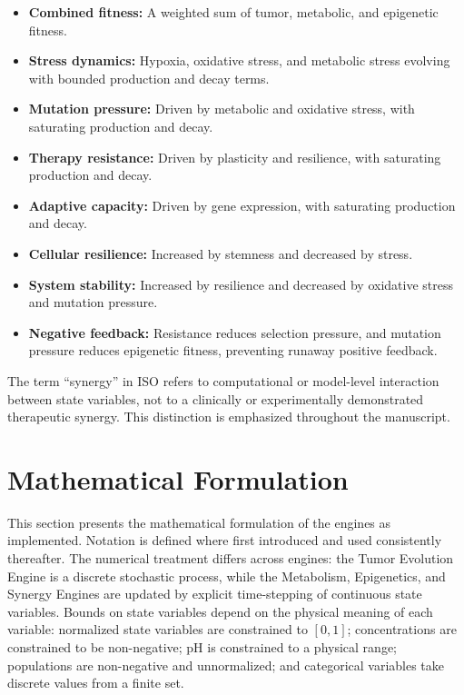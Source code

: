 \documentclass[12pt,a4paper]{article}
\begin{document}
\begin{itemize}[leftmargin=*]
    \item \textbf{Combined fitness:} A weighted sum of tumor, metabolic, and epigenetic fitness.
    \item \textbf{Stress dynamics:} Hypoxia, oxidative stress, and metabolic stress evolving with bounded production and decay terms.
    \item \textbf{Mutation pressure:} Driven by metabolic and oxidative stress, with saturating production and decay.
    \item \textbf{Therapy resistance:} Driven by plasticity and resilience, with saturating production and decay.
    \item \textbf{Adaptive capacity:} Driven by gene expression, with saturating production and decay.
    \item \textbf{Cellular resilience:} Increased by stemness and decreased by stress.
    \item \textbf{System stability:} Increased by resilience and decreased by oxidative stress and mutation pressure.
    \item \textbf{Negative feedback:} Resistance reduces selection pressure, and mutation pressure reduces epigenetic fitness, preventing runaway positive feedback.
\end{itemize}

The term ``synergy'' in ISO refers to computational or model-level interaction between state variables, not to a clinically or experimentally demonstrated therapeutic synergy. This distinction is emphasized throughout the manuscript.

\section{Mathematical Formulation}
\label{sec:math}

This section presents the mathematical formulation of the engines as implemented. Notation is defined where first introduced and used consistently thereafter. The numerical treatment differs across engines: the Tumor Evolution Engine is a discrete stochastic process, while the Metabolism, Epigenetics, and Synergy Engines are updated by explicit time-stepping of continuous state variables. Bounds on state variables depend on the physical meaning of each variable: normalized state variables are constrained to $[0,1]$; concentrations are constrained to be non-negative; pH is constrained to a physical range; populations are non-negative and unnormalized; and categorical variables take discrete values from a finite set.
\end{document}
